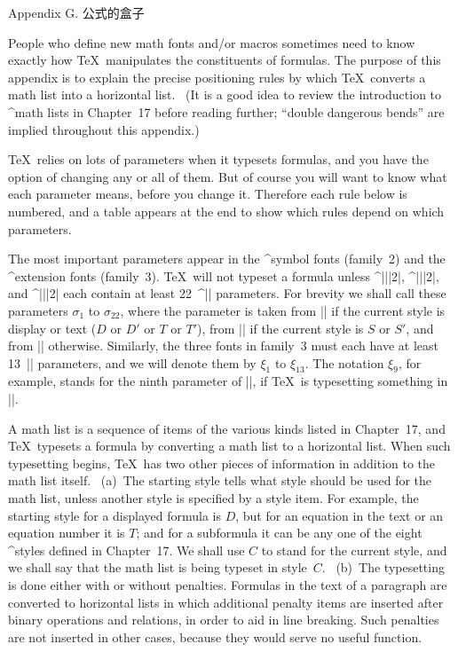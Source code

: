 


\beginchapter Appendix G. 公式的盒子

\ninepoint
People who define new math fonts and/or macros sometimes need to know
exactly how \TeX\ manipulates the constituents of formulas. The purpose
of this appendix is to explain the precise positioning rules by which
\TeX\ converts a math list into a horizontal list. \ (It is a good idea
to review the introduction to ^{math lists} in Chapter~17 before
reading further; ``double dangerous bends'' are implied throughout
this appendix.)

\TeX\ relies on lots of parameters when it typesets formulas, and you have
the option of changing any or all of them. But of course you will want to
know what each parameter means, before you change it. Therefore each rule
below is numbered, and a table appears at the end to show which rules
depend on which parameters.

The most important parameters appear in the ^{symbol fonts} (family~2) and
the ^{extension fonts} (family~3). \TeX\ will not typeset a formula unless
^|\textfont||2|, ^|\scriptfont||2|, and ^|\scriptscriptfont||2| each contain
at least 22~^|\fontdimen| parameters. For brevity we shall call these parameters
$\sigma_1$ to $\sigma_{22}$, where the parameter is taken from
|| if the current style is display or text ($D$ or $D'$ or $T$
or $T'$), from || if the current style is $S$ or $S'$, and from
|| otherwise. Similarly, the three fonts in family~3
must each have at least 13~|\fontdimen| parameters, and we will denote
them by $\xi_1$ to $\xi_{13}$. The notation $\xi_9$, for example, stands for
the ninth parameter of\/ ||, if \TeX\ is typesetting something
in |\scriptstyle|.

A math list is a sequence of items of the various kinds listed in Chapter~17,
and \TeX\ typesets a formula by converting a math list to a horizontal
list. When such typesetting begins, \TeX\ has two other pieces of
information in addition to the math list itself. \ (a)~The starting style
tells what style should be used for the math list, unless another style
is specified by a style item. For example, the starting style for a
displayed formula is $D$, but for an equation in the text or an equation
number it is $T$; and for a subformula it can be any one of the eight
^{styles} defined in Chapter~17. We shall use $C$ to stand for the current
style, and we shall say that the math list is being typeset in style~$C$.
\ (b)~The typesetting is done either with or without penalties. Formulas
in the text of a paragraph are converted to horizontal lists in which
additional penalty items are inserted after binary operations and relations,
in order to aid in line breaking. Such penalties are not inserted in
other cases, because they would serve no useful function.

